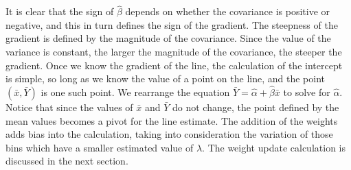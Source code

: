 \documentclass[a4paper,11pt]{article}
\begin{document}
    It is clear that the sign of $\hat{\beta}$ depends on whether the covariance
    is positive or negative, and this in turn defines the sign of the
    gradient. The steepness of the gradient is defined by the magnitude of the
    covariance. Since the value of the variance is constant, the larger the
    magnitude of the covariance, the steeper the gradient. Once we know the
    gradient of the line, the calculation of the intercept is simple, so long as
    we know the value of a point on the line, and the point $(\bar{x},\bar{Y})$
    is one such point. We rearrange the equation
    $\bar{Y}=\hat{\alpha}+\hat{\beta}\bar{x}$ to solve for
    $\hat{\alpha}$. Notice that since the values of $\bar{x}$ and $\bar{Y}$ do
    not change, the point defined by the mean values becomes a pivot for the
    line estimate. The addition of the weights adds bias into the calculation,
    taking into consideration the variation of those bins which have a smaller
    estimated value of $\lambda$. The weight update calculation is discussed in
    the next section.
\end{document}

